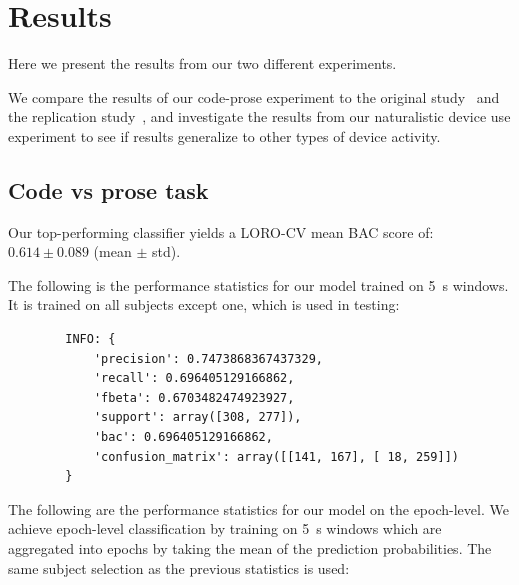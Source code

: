 \chapter{Results}\label{section:results}

    Here we present the results from our two different experiments.

    We compare the results of our code-prose experiment to the original study~\cite{floyd_decoding_2017} and the replication study~\cite{fucci_replication_2019}, and investigate the results from our naturalistic device use experiment to see if results generalize to other types of device activity.


    \section{Code vs prose task}

        Our top-performing classifier yields a LORO-CV mean BAC score of: $0.614 \pm 0.089$ (mean $\pm$ std).

        The following is the performance statistics for our model trained on \SI{5}{\second} windows. It is trained on all subjects except one, which is used in testing:

        \begin{verbatim}
        INFO: {
            'precision': 0.7473868367437329, 
            'recall': 0.696405129166862, 
            'fbeta': 0.6703482474923927, 
            'support': array([308, 277]), 
            'bac': 0.696405129166862, 
            'confusion_matrix': array([[141, 167], [ 18, 259]])
        }
        \end{verbatim}

        The following are the performance statistics for our model on the epoch-level. We achieve epoch-level classification by training on \SI{5}{\second} windows which are aggregated into epochs by taking the mean of the prediction probabilities. The same subject selection as the previous statistics is used:

